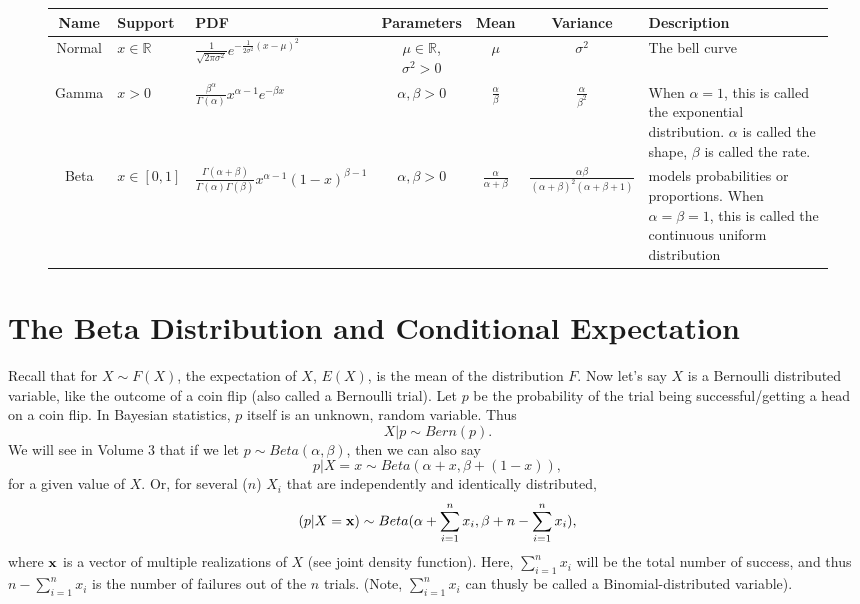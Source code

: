 \begin{figure}[h]
\begin{center}
\begin{tabular}{|c|l|l|c|c|c|l|}
	\hline
Name & Support &  PDF & Parameters & Mean & Variance & Description\\
\hline \hline
Normal  & $x \in \mathbb{R}$ &$\frac{1}{\sqrt{2\pi \sigma^2}} e^{-\frac{1}{2\sigma^2}(x-\mu)^2}$ & $\mu \in \mathbb{R}$, $\sigma^2 > 0$ & $\mu$ & $\sigma^2$ & The bell curve\\ \hline
Gamma  & $x>0$ &$\frac{\beta^\alpha}{\Gamma(\alpha)} x^{\alpha -1} e^{-\beta x}$ & $\alpha,\beta>0$ & $\frac{\alpha}{\beta}$ & $\frac{\alpha}{\beta^2}$ & When $\alpha=1$, this is called the exponential distribution. $\alpha$ is called the shape, $\beta$ is called the rate.\\ \hline
Beta  & $x \in [0,1]$ & $\frac{\Gamma(\alpha+\beta)}{\Gamma(\alpha)\Gamma(\beta)} x^{\alpha-1} (1-x)^{\beta-1}$ & $\alpha,\beta>0$ & $\frac{\alpha}{\alpha + \beta}$ & $\frac{\alpha \beta}{(\alpha + \beta)^2(\alpha + \beta +1)}$ & models probabilities or proportions. When $\alpha = \beta =1$, this is called the continuous uniform distribution\\ 
\hline
\end{tabular}
\end{center}
\end{figure}

\section*{The Beta Distribution and Conditional Expectation}
Recall that for $X \sim F(X)$, the expectation of $X$, $E(X)$, is the mean of the distribution $F$. Now let's say $X$ is a Bernoulli distributed variable, like the outcome of a coin flip (also called a Bernoulli trial). Let $p$ be the probability of the trial being successful/getting a head on a coin flip. In Bayesian statistics, $p$ itself is an unknown, random variable. Thus $$X|p \sim Bern(p).$$ 
We will see in Volume 3 that if we let $p \sim Beta(\alpha,\beta)$, then we can also say $$p|X=x \sim Beta(\alpha+x,\beta+(1-x)),$$ for a given value of $X$. Or, for several ($n$) $X_i$ that are independently and identically distributed, 
\[
(p|X={\bf x}) \sim Beta(\alpha+\sum_{i=1}^n x_i,\beta+n-\sum_{i=1}^n x_i),
\]
where ${\bf x}$ is a vector of multiple realizations of $X$ (see joint density function). Here, $\sum_{i=1}^n x_i$ will be the total number of success, and thus $n-\sum_{i=1}^n x_i$ is the number of failures out of the $n$ trials. (Note, $\sum_{i=1}^n x_i$ can thusly be called a Binomial-distributed variable).

